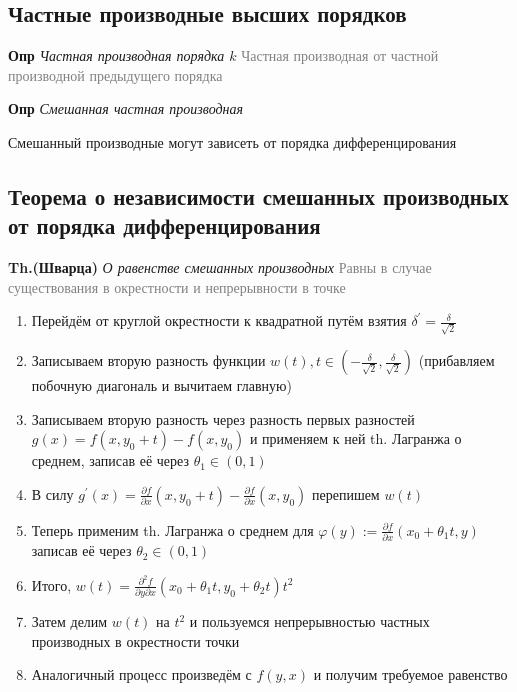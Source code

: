 \subsection{Частные производные высших порядков}

\textbf{Опр} \textit{Частная производная порядка $k$}
\textcolor{gray}{Частная производная от частной производной предыдущего порядка}

\textbf{Опр} \textit{Смешанная частная производная}

Смешанный производные могут зависеть от порядка дифференцирования

\subsection{Теорема о независимости смешанных производных от порядка дифференцирования}

\textbf{Th.(Шварца)} \textit{О равенстве смешанных производных}
\textcolor{gray}{Равны в случае существования в окрестности и непрерывности в точке}

\begin{enumerate}
    \item Перейдём от круглой окрестности к квадратной путём взятия $\delta^{'} = \frac{\delta}{\sqrt{2}}$
    \item Записываем вторую разность функции $w(t), t \in \left(-\frac{\delta}{\sqrt{2}}, \frac{\delta}{\sqrt{2}}\right)$
    (прибавляем побочную диагональ и вычитаем главную)
    \item Записываем вторую разность через разность первых разностей $g(x) = f(x, y_0 + t) - f(x, y_0)$ и применяем к
    ней th.
    Лагранжа о среднем, записав её через $\theta_1 \in (0, 1)$
    \item В силу $g^{'}(x) = \frac{\partial f}{\partial x} (x, y_0 + t) - \frac{\partial f}{\partial x} (x, y_0)$
    перепишем $w(t)$
    \item Теперь применим th.
    Лагранжа о среднем для $\varphi (y) := \frac{\partial f}{\partial x} (x_0 + \theta_1 t, y)$ записав её через
    $\theta_2 \in (0, 1)$
    \item Итого, $w(t) = \frac{\partial^2 f}{\partial y \partial x} (x_0 + \theta_1 t, y_0 + \theta_2 t)t^2$
    \item Затем делим $w(t)$ на $t^2$ и пользуемся непрерывностью частных производных в окрестности точки
    \item Аналогичный процесс произведём с $f(y, x)$ и получим требуемое равенство
\end{enumerate}


